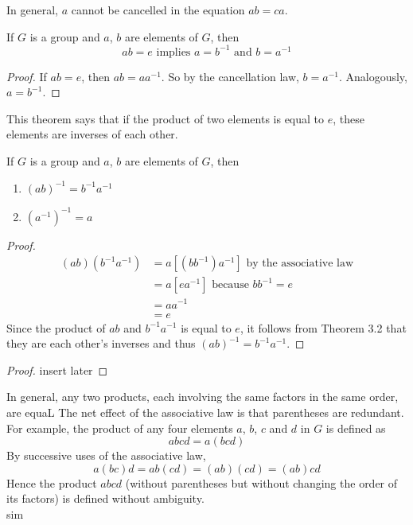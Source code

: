\documentclass[12pt]{article}
\newcommand{\inverse}[1]{#1 ^{-1}}
\newcommand{\pinverse}[1]{(#1)^{-1}}
\begin{document}
In general, $a$ cannot be cancelled in the equation $ab = ca$. 

\begin{theorem} If $G$ is a group and $a$, $b$ are elements of $G$, then $$ab = e \text{ implies } a = \inverse{b} \text{ and } b = \inverse{a} $$ \end{theorem} 

\begin{proof} If $ab = e$, then $ab = a\inverse{a}$. So by the cancellation law, $b = \inverse{a}$. Analogously, $a = \inverse{b}$. \end{proof} 

This theorem says that if the product of two elements is equal to $e$, these elements are inverses of each other. 

\begin{theorem} If $G$ is a group and $a$, $b$ are elements of $G$, then \begin{enumerate} 
\item $\pinverse{ab} = \inverse{b}\inverse{a}$ 
\item $\pinverse{\inverse{a}} = a$ \end{enumerate} \end{theorem} 

\begin{proof} $$\begin{aligned} (ab)(\inverse{b}\inverse{a}) &= a[(b\inverse{b})\inverse{a}] \text{ by the associative law} \\ &= a[e\inverse{a}] \text{ because } b\inverse{b} = e \\ &= a\inverse{a} \\ &= e \end{aligned} $$ Since the product of $ab$ and $\inverse{b}\inverse{a}$ is equal to $e$, it follows from Theorem 3.2 that they are each other's inverses and thus $\pinverse{ab} = \inverse{b}\inverse{a}$. \end{proof} 

\begin{proof} insert later \end{proof} 

In general, any two products, each involving the same factors in the same order, are equaL The net effect of the associative law is that parentheses are redundant. For example, the product of any four elements $a$, $b$, $c$ and $d$ in $G$ is defined as $$abcd = a(bcd)$$  By successive uses of the associative law,
$$a(bc)d = ab(cd) = (ab)(cd) = (ab)cd $$ Hence the product $abcd$ (without parentheses but without changing the order of its factors) is defined without ambiguity. \\sim\\
\end{document}
